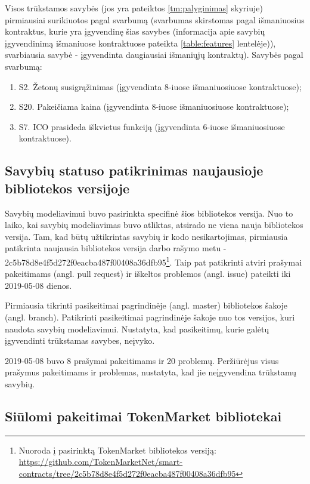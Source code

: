 \documentclass{VUMIFPSbakalaurinis}
\begin{document}
Visos trūkstamos savybės (jos yra pateiktos \ref{tm:palyginimas} skyriuje) pirmiausiai surikiuotos pagal svarbumą (svarbumas skirstomas pagal išmaniuosius kontraktus, kurie yra įgyvendinę šias savybes (informacija apie savybių įgyvendinimą išmaniuose kontraktuose pateikta \ref{table:features} lentelėje)), svarbiausia savybė - įgyvendinta daugiausiai išmaniųjų kontraktų). Savybės pagal svarbumą:
\begin{enumerate}[topsep=0pt,itemsep=-1ex,partopsep=1ex,parsep=1ex]
\item S2. Žetonų susigrąžinimas (įgyvendinta 8-iuose išmaniuosiuose kontraktuose);
\item S20. Pakeičiama kaina (įgyvendinta 8-iuose išmaniuosiuose kontraktuose);
\item S7. ICO prasideda iškvietus funkciją (įgyvendinta 6-iuose išmaniuosiuose kontraktuose).
\end{enumerate}



\subsection{Savybių statuso patikrinimas naujausioje bibliotekos versijoje}

Savybių modeliavimui buvo pasirinkta specifinė šios bibliotekos versija. Nuo to laiko, kai savybių modeliavimas buvo atliktas, atsirado ne viena nauja bibliotekos versija. Tam, kad būtų užtikrintas savybių ir kodo nesikartojimas, pirmiausia patikrinta naujausia bibliotekos versija  darbo rašymo metu - 2c5b78d8e4f5d272f0eacba487f00408a36dfb95\footnote{Nuoroda į pasirinktą TokenMarket bibliotekos versiją: \url{https://github.com/TokenMarketNet/smart-contracts/tree/2c5b78d8e4f5d272f0eacba487f00408a36dfb95}}. Taip pat patikrinti atviri prašymai pakeitimams (angl. pull request) ir iškeltos problemos (angl. issue) pateikti iki 2019-05-08 dienos.

Pirmiausia tikrinti pasikeitimai pagrindinėje (angl. master) bibliotekos šakoje (angl. branch). Patikrinti pasikeitimai pagrindinėje šakoje nuo tos versijos, kuri naudota savybių modeliavimui. Nustatyta, kad pasikeitimų, kurie galėtų įgyvendinti trūkstamas savybes, neįvyko.

2019-05-08 buvo 8 prašymai pakeitimams ir 20 problemų. Peržiūrėjus visus prašymus pakeitimams ir problemas, nustatyta, kad jie neįgyvendina trūkstamų savybių.


\subsection{Siūlomi pakeitimai TokenMarket bibliotekai}
\end{document}
